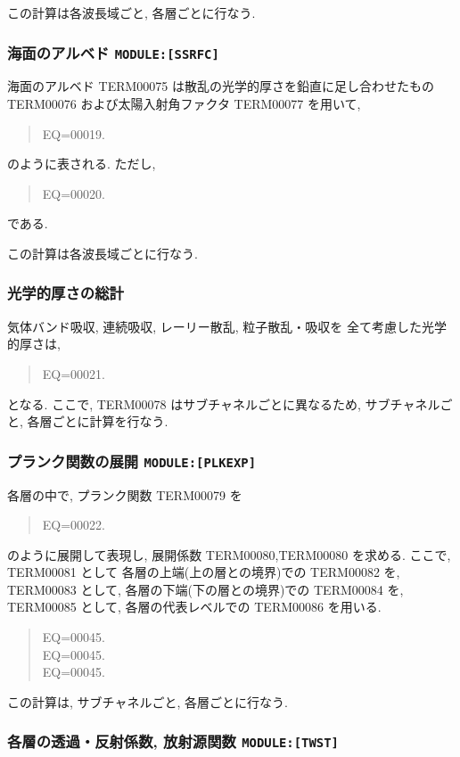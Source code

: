 この計算は各波長域ごと, 各層ごとに行なう.

\subsubsection{海面のアルベド \texttt{MODULE:[SSRFC]}}

海面のアルベド TERM00075 は散乱の光学的厚さを鉛直に足し合わせたもの
TERM00076 および太陽入射角ファクタ TERM00077 を用いて,
\begin{quote}
EQ=00019.
\end{quote}
のように表される.
ただし,
\begin{quote}
EQ=00020.
\end{quote}
である.

この計算は各波長域ごとに行なう.

\subsubsection{光学的厚さの総計}

気体バンド吸収, 連続吸収, レーリー散乱, 粒子散乱・吸収を
全て考慮した光学的厚さは, 
%
\begin{quote}
EQ=00021.
\end{quote}
%
となる. ここで, TERM00078 はサブチャネルごとに異なるため,
サブチャネルごと, 各層ごとに計算を行なう.

\subsubsection{プランク関数の展開 \texttt{MODULE:[PLKEXP]}}

各層の中で, プランク関数 TERM00079 を
\begin{quote}
EQ=00022.
\end{quote}
のように展開して表現し, 展開係数 TERM00080,TERM00080 を求める.
ここで, TERM00081 として
各層の上端(上の層との境界)での TERM00082 を,
TERM00083 として, 各層の下端(下の層との境界)での TERM00084 を,
TERM00085 として, 各層の代表レベルでの TERM00086 を用いる.
\begin{quote}
\nonumber
EQ=00045.\\
EQ=00045.\\
\nonumber
EQ=00045.
\end{quote}

この計算は, サブチャネルごと, 各層ごとに行なう.

\subsubsection{各層の透過・反射係数, 放射源関数 \texttt{MODULE:[TWST]}}

